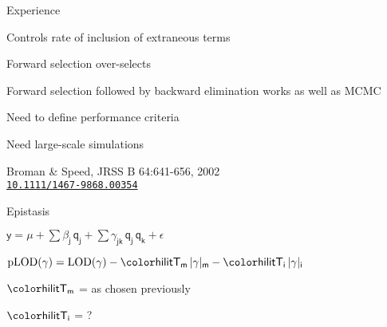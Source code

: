 \documentclass[aspectratio=169,12pt,t]{beamer}
\newcommand{\lod}{\text{LOD}}
\newcommand{\plod}{\text{pLOD}}
\begin{document}
\begin{frame}{Experience}

\bbi
\item Controls rate of inclusion of extraneous terms
\item Forward selection over-selects
\item {\vhilit Forward selection followed by backward elimination} works as well
  as MCMC
\item {\hilit Need to define performance criteria}
\item {\hilit Need large-scale simulations}
\ei

\bigskip \bigskip \bigskip

\footnotesize
\hfill Broman \& Speed, JRSS B 64:641-656, 2002 \\
\hfill \href{https://doi.org/10.1111/1467-9868.00354}{\tt 10.1111/1467-9868.00354}

\note{
}
\end{frame}







\begin{frame}{Epistasis}

\bigskip \bigskip \bigskip

\centerline{
$\mathsf{y  = \mu + \sum \beta_j \, q_j + \sum \gamma_{jk} \, q_j \,
    q_k + \epsilon}$
}

\bigskip \bigskip \bigskip

{\hilit
$\mathsf{ \plod(\gamma) = \lod(\gamma) -
    {\hilit T_m} \, |\gamma|_m - {\hilit T_i} \, |\gamma|_i }$
}


\bigskip \bigskip \bigskip

\hspace{3em} $\mathsf{\hilit T_m}$ = as chosen previously

\bigskip

\hspace{3em} $\mathsf{\hilit T_i}$ = ?

\note{
}
\end{frame}
\end{document}
